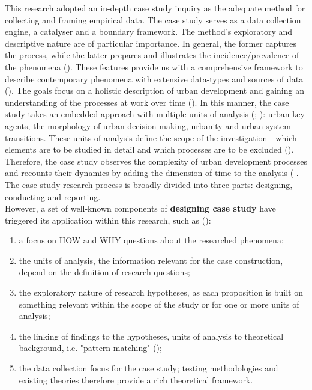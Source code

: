 \documentclass[11pt]{report}
\begin{document}
This research adopted an in-depth case study inquiry as the adequate method for collecting and framing empirical data. The case study serves as a data collection engine, a catalyser and a boundary framework. The method’s exploratory and descriptive nature are of particular importance. In general, the former captures the process, while the latter prepares and illustrates the incidence/prevalence of the phenomena (\href{Yin} {\citealt{yin_applications_2011}}). These features provide us with a comprehensive framework to describe contemporary phenomena with extensive data-types and sources of data (\href{Feagin}{\citealt{feagin_case_1991}}). The goals focus on a holistic description of urban development and gaining an understanding of the processes at work over time (\href{Swanborn}{\citealt{swanborn_case_2010}}). In this manner, the case study takes an embedded approach with multiple units of analysis (\href{Scholz}{\citealt{scholz_embedded_2002}}; \href{Yin} {\citealt{yin_case_2009}}): urban key agents, the morphology of urban decision making, urbanity and urban system transitions. These units of analysis define the scope of the investigation - which elements are to be studied in detail and which processes are to be excluded (\href{Harrison}{\citealt{partington_case_2002}}).
\\

Therefore, the case study observes the complexity of urban development processes and recounts their dynamics by adding the dimension of time to the analysis (\href{Feagin}{ \cite{feagin_case_1991}}.
The case study research process is broadly divided into three parts: designing, conducting and reporting. 
\\

However, a set of well-known components of \textbf{designing case study} have triggered its application within this research, such as (\href{Yin} {\citealt{yin_case_2009}}):

\begin{enumerate}
\item a focus on HOW and WHY questions about the researched phenomena;
\item the units of analysis, the information relevant for the case construction, depend on the definition of research questions;
\item the exploratory nature of research hypotheses, as each proposition is built on something relevant within the scope of the study or for one or more units of analysis;
\item the linking of findings to the hypotheses, units of analysis to theoretical background, i.e. "pattern matching" (\href{Campbell}{\citealt{campbell_iii.degrees_1975}});
\item the data collection focus for the case study; testing methodologies and existing theories therefore provide a rich theoretical framework.
\end{enumerate}
\end{document}
